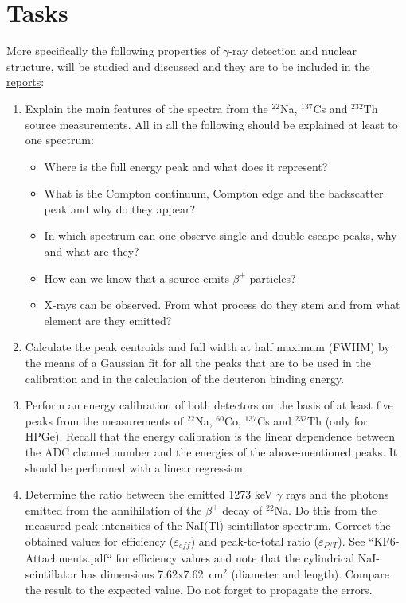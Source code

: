 \documentclass[12pt]{article}
\begin{document}
\section*{Tasks}
More specifically the following properties of $\gamma$-ray detection and nuclear structure, will be studied and discussed \underline{and they are to be included in the reports}:
\begin{enumerate}
  \item Explain the main features of the spectra from the $^{22}$Na, $^{137}$Cs and $^{232}$Th source measurements. All in all the following should be explained at least to one spectrum:
    \begin{itemize}
      \item Where is the full energy peak and what does it represent?
      \item What is the Compton continuum, Compton edge and the backscatter peak and why do they appear?
      \item In which spectrum can one observe single and double escape peaks, why and what are they?
      \item How can we know that a source emits $\beta^{+}$ particles?
      \item X-rays can be observed. From what process do they stem and from what element are they emitted?
    \end{itemize}
  \item Calculate the peak centroids and full width at half maximum (FWHM) by the means of a Gaussian fit for all the peaks that are to be used in the calibration and in the calculation of the deuteron binding energy.
  \item Perform an energy calibration of both detectors on the basis of at least five peaks from the measurements of $^{22}$Na, $^{60}$Co, $^{137}$Cs and $^{232}$Th (only for HPGe). Recall that the energy calibration is the linear dependence between the ADC channel number and the energies of the above-mentioned peaks. It should be performed with a linear regression.
  \item Determine the ratio between the emitted 1273 keV $\gamma$ rays and the photons emitted from the annihilation of the $\beta^+$ decay of $^{22}$Na. Do this from the measured peak intensities of the NaI(Tl) scintillator spectrum. Correct the obtained values for efficiency ($\varepsilon_{eff}$) and peak-to-total ratio ($\varepsilon_{P/T}$). See ``KF6-Attachments.pdf`` for efficiency values and note that the cylindrical NaI-scintillator has dimensions 7.62x7.62~cm$^2$ (diameter and length). Compare the result to the expected value. Do not forget to propagate the errors.

\end{enumerate}
\end{document}
